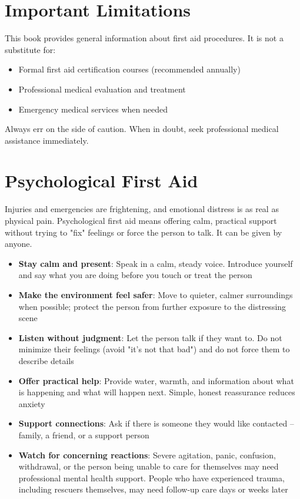 \section{Important Limitations}

This book provides general information about first aid procedures. It is not a substitute for:

\begin{itemize}[leftmargin=*]
  \item Formal first aid certification courses (recommended annually)
  \item Professional medical evaluation and treatment
  \item Emergency medical services when needed
\end{itemize}

Always err on the side of caution. When in doubt, seek professional medical assistance immediately.

\section{Psychological First Aid}

Injuries and emergencies are frightening, and emotional distress is as real as physical pain. Psychological first aid means offering calm, practical support without trying to "fix" feelings or force the person to talk. It can be given by anyone.

\begin{itemize}[leftmargin=*]
  \item \textbf{Stay calm and present}: Speak in a calm, steady voice. Introduce yourself and say what you are doing before you touch or treat the person
  \item \textbf{Make the environment feel safer}: Move to quieter, calmer surroundings when possible; protect the person from further exposure to the distressing scene
  \item \textbf{Listen without judgment}: Let the person talk if they want to. Do not minimize their feelings (avoid "it's not that bad") and do not force them to describe details
  \item \textbf{Offer practical help}: Provide water, warmth, and information about what is happening and what will happen next. Simple, honest reassurance reduces anxiety
  \item \textbf{Support connections}: Ask if there is someone they would like contacted -- family, a friend, or a support person
  \item \textbf{Watch for concerning reactions}: Severe agitation, panic, confusion, withdrawal, or the person being unable to care for themselves may need professional mental health support. People who have experienced trauma, including rescuers themselves, may need follow-up care days or weeks later
\end{itemize}

